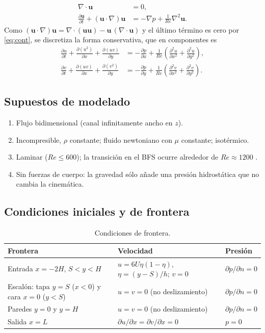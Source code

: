 \documentclass[11pt,letterpaper]{article}
\newcommand{\vu}{\mathbf{u}}
\newcommand{\Rey}{\mathit{Re}}
\begin{document}
\begin{align}
\nabla\cdot\vu &= 0, \label{eq:cont}\\
\frac{\partial\vu}{\partial t}+(\vu\cdot\nabla)\vu &= -\nabla p+\frac{1}{\Rey}\nabla^2\vu. \label{eq:ns}
\end{align}
Como $(\vu\cdot\nabla)\vu=\nabla\cdot(\vu\vu)-\vu\,(\nabla\cdot\vu)$ y el último término es cero por
\eqref{eq:cont}, se discretiza la forma conservativa, que en componentes es
\begin{align}
\frac{\partial u}{\partial t}+\frac{\partial (u^2)}{\partial x}+\frac{\partial (uv)}{\partial y}
  &= -\frac{\partial p}{\partial x}+\frac{1}{\Rey}\left(\frac{\partial^2u}{\partial x^2}+\frac{\partial^2u}{\partial y^2}\right),\\
\frac{\partial v}{\partial t}+\frac{\partial (uv)}{\partial x}+\frac{\partial (v^2)}{\partial y}
  &= -\frac{\partial p}{\partial y}+\frac{1}{\Rey}\left(\frac{\partial^2v}{\partial x^2}+\frac{\partial^2v}{\partial y^2}\right).
\end{align}

\subsection{Supuestos de modelado}
\begin{enumerate}
  \item Flujo bidimensional (canal infinitamente ancho en $z$).
  \item Incompresible, $\rho$ constante; fluido newtoniano con $\mu$ constante; isotérmico.
  \item Laminar ($\Rey\le600$); la transición en el BFS ocurre alrededor de $\Rey\approx1200$ \cite{armaly}.
  \item Sin fuerzas de cuerpo: la gravedad sólo añade una presión hidrostática que no cambia la cinemática.
\end{enumerate}

\subsection{Condiciones iniciales y de frontera}

\begin{table}[H]
\centering\small
\caption{Condiciones de frontera.}
\label{tab:cf}
\begin{tabular}{@{}lll@{}}
\toprule
Frontera & Velocidad & Presión\\
\midrule
Entrada $x=-2H$, $S<y<H$ & $u=6U\eta(1-\eta)$, $\eta=(y-S)/h$; $v=0$ & $\partial p/\partial n=0$\\
Escalón: tapa $y=S$ ($x<0$) y cara $x=0$ ($y<S$) & $u=v=0$ (no deslizamiento) & $\partial p/\partial n=0$\\
Paredes $y=0$ y $y=H$ & $u=v=0$ (no deslizamiento) & $\partial p/\partial n=0$\\
Salida $x=L$ & $\partial u/\partial x=\partial v/\partial x=0$ & $p=0$\\
\bottomrule
\end{tabular}
\end{table}
\end{document}
